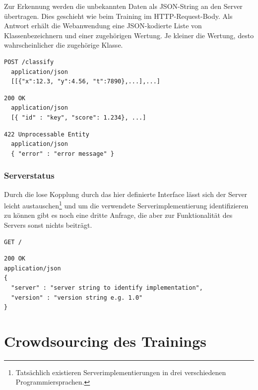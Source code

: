 Zur Erkennung werden die unbekannten Daten als \ac{JSON}-String an den Server übertragen. Dies geschieht wie beim Training im \ac{HTTP}-Request-Body. Als Antwort erhält die Webanwendung eine \ac{JSON}-kodierte Liste von Klassenbezeichnern und einer zugehörigen Wertung. Je kleiner die Wertung, desto wahrscheinlicher die zugehörige Klasse.

\begin{lstlisting}[caption={Anfrage}]
  POST /classify
  application/json
  [[{"x":12.3, "y":4.56, "t":7890},...],...]
\end{lstlisting}
\begin{lstlisting}[caption={Antwort}]
  200 OK
  application/json
  [{ "id" : "key", "score": 1.234}, ...]
\end{lstlisting}
\begin{lstlisting}[caption={Antwort im Fehlerfall}]
  422 Unprocessable Entity
  application/json
  { "error" : "error message" }
\end{lstlisting}

\subsubsection{Serverstatus}

Durch die lose Kopplung durch das hier definierte Interface lässt sich der Server leicht austauschen\footnote{Tatsächlich existieren Serverimplementierungen in drei verschiedenen Programmiersprachen.} und um die verwendete Serverimplementierung identifizieren zu können gibt es noch eine dritte Anfrage, die aber zur Funktionalität des Servers sonst nichts beiträgt.

\begin{lstlisting}[caption={Anfrage}]
GET /
\end{lstlisting}
\begin{lstlisting}[caption={Antwort}]
200 OK
application/json
{
  "server" : "server string to identify implementation",
  "version" : "version string e.g. 1.0"
}
\end{lstlisting}




\section{Crowdsourcing des Trainings} %
\label{sec:crowdsourcing}


